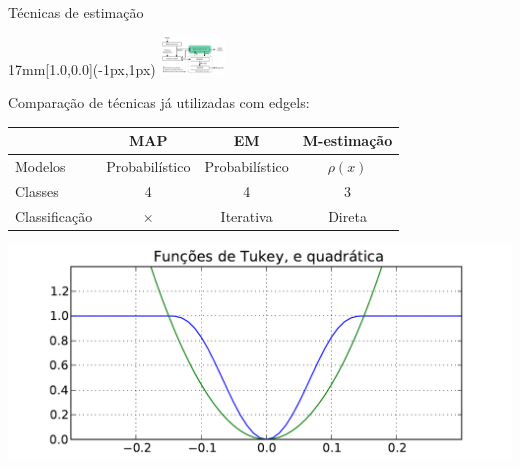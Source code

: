 \begin{frame}{Técnicas de estimação}
  \begin{textblock*}{17mm}[1.0,0.0](\paperwidth-1px,1px)
    \includegraphics[width=17mm]{blocos_s3.png}
  \end{textblock*}
  Comparação de técnicas já utilizadas com edgels:

  {\footnotesize
    \begin{tabularx}{\textwidth}{lCCC}
      \toprule
      & MAP & EM & M-estimação\\
      \hline
      Modelos & Probabilístico & Probabilístico & $\rho(x)$ \\
      Classes & 4 & 4 & 3\\ 
      Classificação & $\times$ & Iterativa & Direta\\
      \bottomrule
    \end{tabularx}
  }
  
  \hspace{-0.25\baselineskip}\centerline{
    \includegraphics[height=7\baselineskip]{tukey.pdf}
  }
\end{frame}





